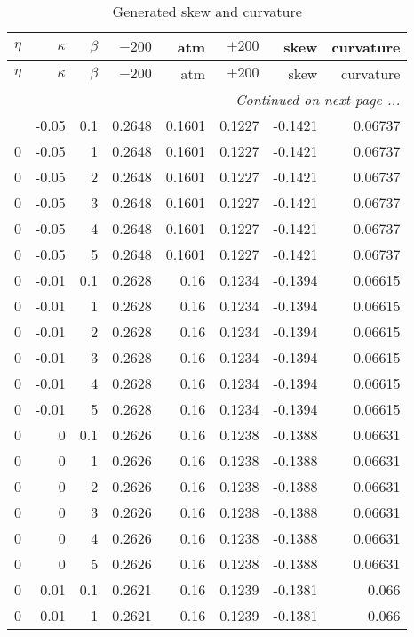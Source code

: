 \documentclass{amsart}
\theoremstyle{plain}
\numberwithin{equation}{section}
\begin{document}
\begin{longtable}{r | r | r | r | r | r | r | r}
\caption{Generated skew and curvature} \\
$\eta$ & $\kappa$ & $\beta$ & $-200$ & atm & $+200$ & skew & curvature \\ \hline
\endfirsthead
$\eta$ & $\kappa$ & $\beta$ & $-200$ & atm & $+200$ & skew & curvature \\ \hline
\endhead
\multicolumn{8}{r}{\textit{Continued on next page ...}} \\
\endfoot
\endlastfoot
0 & -0.05 & 0.1 & 0.2648 & 0.1601 & 0.1227 & -0.1421 & 0.06737 \\
0 & -0.05 & 1 & 0.2648 & 0.1601 & 0.1227 & -0.1421 & 0.06737 \\
0 & -0.05 & 2 & 0.2648 & 0.1601 & 0.1227 & -0.1421 & 0.06737 \\
0 & -0.05 & 3 & 0.2648 & 0.1601 & 0.1227 & -0.1421 & 0.06737 \\
0 & -0.05 & 4 & 0.2648 & 0.1601 & 0.1227 & -0.1421 & 0.06737 \\
0 & -0.05 & 5 & 0.2648 & 0.1601 & 0.1227 & -0.1421 & 0.06737 \\ \hline
0 & -0.01 & 0.1 & 0.2628 & 0.16 & 0.1234 & -0.1394 & 0.06615 \\
0 & -0.01 & 1 & 0.2628 & 0.16 & 0.1234 & -0.1394 & 0.06615 \\
0 & -0.01 & 2 & 0.2628 & 0.16 & 0.1234 & -0.1394 & 0.06615 \\
0 & -0.01 & 3 & 0.2628 & 0.16 & 0.1234 & -0.1394 & 0.06615 \\
0 & -0.01 & 4 & 0.2628 & 0.16 & 0.1234 & -0.1394 & 0.06615 \\
0 & -0.01 & 5 & 0.2628 & 0.16 & 0.1234 & -0.1394 & 0.06615 \\ \hline
0 & 0 & 0.1 & 0.2626 & 0.16 & 0.1238 & -0.1388 & 0.06631 \\
0 & 0 & 1 & 0.2626 & 0.16 & 0.1238 & -0.1388 & 0.06631 \\
0 & 0 & 2 & 0.2626 & 0.16 & 0.1238 & -0.1388 & 0.06631 \\
0 & 0 & 3 & 0.2626 & 0.16 & 0.1238 & -0.1388 & 0.06631 \\
0 & 0 & 4 & 0.2626 & 0.16 & 0.1238 & -0.1388 & 0.06631 \\
0 & 0 & 5 & 0.2626 & 0.16 & 0.1238 & -0.1388 & 0.06631 \\ \hline
0 & 0.01 & 0.1 & 0.2621 & 0.16 & 0.1239 & -0.1381 & 0.066 \\
0 & 0.01 & 1 & 0.2621 & 0.16 & 0.1239 & -0.1381 & 0.066 \\

\end{longtable}
\end{document}
